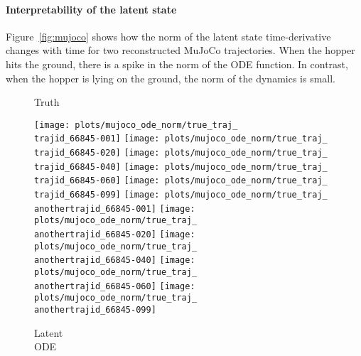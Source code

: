 \documentclass{article}
\begin{document}
\paragraph{Interpretability of the latent state}
Figure~\ref{fig:mujoco} shows how the norm of the latent state time-derivative  changes with time for two reconstructed MuJoCo trajectories.
When the hopper hits the ground, there is a spike in the norm of the ODE function.
In contrast, when the hopper is lying on the ground, the norm of the dynamics is small. 


\newcommand{\nfwidth}{0.09\textwidth}\newcommand{\trajid}{9}\newcommand{\anothertrajid}{5}\begin{figure*}[b]
\begin{subfigure}[b]{0.07\linewidth}
	    \small
		Truth
		\vspace{3mm}
	\end{subfigure}
\begin{subfigure}[b]{0.9\linewidth}
		\centering
		\texttt{[image: plots/mujoco\_ode\_norm/true\_traj\_\\trajid\_66845-001]}
		\texttt{[image: plots/mujoco\_ode\_norm/true\_traj\_\\trajid\_66845-020]}
		\texttt{[image: plots/mujoco\_ode\_norm/true\_traj\_\\trajid\_66845-040]}
		\texttt{[image: plots/mujoco\_ode\_norm/true\_traj\_\\trajid\_66845-060]}
		\texttt{[image: plots/mujoco\_ode\_norm/true\_traj\_\\trajid\_66845-099]}
		\hfill
		\texttt{[image: plots/mujoco\_ode\_norm/true\_traj\_\\anothertrajid\_66845-001]}
		\texttt{[image: plots/mujoco\_ode\_norm/true\_traj\_\\anothertrajid\_66845-020]}
		\texttt{[image: plots/mujoco\_ode\_norm/true\_traj\_\\anothertrajid\_66845-040]}
		\texttt{[image: plots/mujoco\_ode\_norm/true\_traj\_\\anothertrajid\_66845-060]}
		\texttt{[image: plots/mujoco\_ode\_norm/true\_traj\_\\anothertrajid\_66845-099]}
	\end{subfigure}
\begin{subfigure}[b]{0.07\linewidth}
		\small
    	 Latent\\ODE
    	 \vspace{2mm}
	\end{subfigure}
\begin{subfigure}[b]{0.9\linewidth}

\end{subfigure}
\end{figure*}
\end{document}
